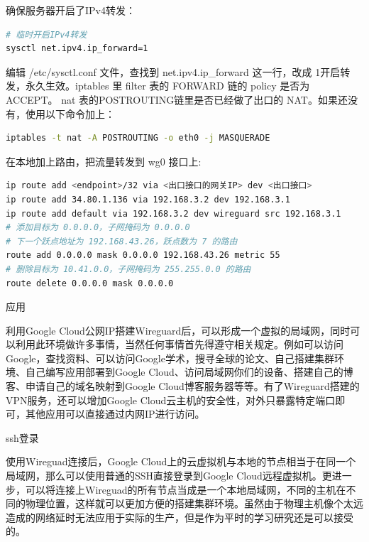 \documentclass[8pt]{book}
\makeatletter
\numberwithin{dummy}{section}
\theoremstyle{ocrenumbox}
\theoremstyle{blacknumex}
\theoremstyle{blacknumbox}
\theoremstyle{ocrenum}
\renewcommand{\subsection}{\@startsection {subsection}{2}{\z@}
	{-3ex \@plus -0.1ex \@minus -.4ex}
	{0.5ex \@plus.2ex }
	{\normalfont\sffamily\bfseries}}
\renewcommand{\subsubsection}{\@startsection {subsubsection}{3}{\z@}
	{-2ex \@plus -0.1ex \@minus -.2ex}
	{.2ex \@plus.2ex }
	{\normalfont\small\sffamily\bfseries}}
\makeatother
\begin{document}
确保服务器开启了IPv4转发：

\begin{lstlisting}[language=Bash]
# 临时开启IPv4转发
sysctl net.ipv4.ip_forward=1
\end{lstlisting}

编辑 /etc/sysctl.conf 文件，查找到 net.ipv4.ip\_forward 这一行，改成 1开启转发，永久生效。iptables 里 filter 表的 FORWARD 链的 policy 是否为 ACCEPT。 nat 表的POSTROUTING链里是否已经做了出口的 NAT。如果还没有，使用以下命令加上：

\begin{lstlisting}[language=Bash]
iptables -t nat -A POSTROUTING -o eth0 -j MASQUERADE
\end{lstlisting}

在本地加上路由，把流量转发到 wg0 接口上:

\begin{lstlisting}[language=Bash]
ip route add <endpoint>/32 via <出口接口的网关IP> dev <出口接口>
ip route add 34.80.1.136 via 192.168.3.2 dev 192.168.3.1
ip route add default via 192.168.3.2 dev wireguard src 192.168.3.1
# 添加目标为 0.0.0.0，子网掩码为 0.0.0.0
# 下一个跃点地址为 192.168.43.26，跃点数为 7 的路由
route add 0.0.0.0 mask 0.0.0.0 192.168.43.26 metric 55
# 删除目标为 10.41.0.0，子网掩码为 255.255.0.0 的路由
route delete 0.0.0.0 mask 0.0.0.0
\end{lstlisting}

\subsection{应用}

利用Google Cloud公网IP搭建Wireguard后，可以形成一个虚拟的局域网，同时可以利用此环境做许多事情，当然任何事情首先得遵守相关规定。例如可以访问Google，查找资料、可以访问Google学术，搜寻全球的论文、自己搭建集群环境、自己编写应用部署到Google Cloud、访问局域网你们的设备、搭建自己的博客、申请自己的域名映射到Google Cloud博客服务器等等。有了Wireguard搭建的VPN服务，还可以增加Google Cloud云主机的安全性，对外只暴露特定端口即可，其他应用可以直接通过内网IP进行访问。

\subsubsection{ssh登录}

使用Wireguad连接后，Google Cloud上的云虚拟机与本地的节点相当于在同一个局域网，那么可以使用普通的SSH直接登录到Google Cloud远程虚拟机。更进一步，可以将连接上Wireguad的所有节点当成是一个本地局域网，不同的主机在不同的物理位置，这样就可以更加方便的搭建集群环境。虽然由于物理主机像个太远造成的网络延时无法应用于实际的生产，但是作为平时的学习研究还是可以接受的。
\end{document}
